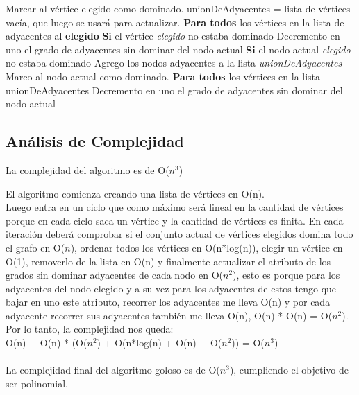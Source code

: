 \begin{codebox}
\li 	Marcar al vértice elegido como dominado.
\li 	unionDeAdyacentes = lista de vértices vacía, que luego se usará para actualizar.
\li 	\textbf{Para todos} los vértices en la lista de adyacentes al \textbf{elegido} \Do
\li 		\textbf{Si} el vértice \textit{elegido} no estaba dominado \Do
\li 			Decremento en uno el grado de adyacentes sin dominar del nodo actual \End
\li 		\textbf{Si} el nodo actual \textit{elegido} no estaba dominado \Do
\li 			Agrego los nodos adyacentes a la lista \textit{unionDeAdyacentes} \End
\li 		Marco al nodo actual como dominado. \End
\li 	\textbf{Para todos} los vértices en la lista unionDeAdyacentes \Do 
\li 			Decremento en uno el grado de adyacentes sin dominar del nodo actual \End %
\end{codebox}

\subsection{Análisis de Complejidad}

La complejidad del algoritmo es de O($n^3$)

El algoritmo comienza creando una lista de vértices en O(n).\\
Luego entra en un ciclo que como máximo será lineal en la cantidad de vértices porque en cada ciclo saca un vértice y la cantidad de vértices es finita. En cada iteración deberá comprobar si el conjunto actual de vértices elegidos domina todo el grafo en O($n$), ordenar todos los vértices en O(n*log(n)), elegir un vértice en O(1), removerlo de la lista en O(n) y finalmente actualizar el atributo de los grados sin dominar adyacentes de cada nodo en O($n^2$), esto es porque para los adyacentes del nodo elegido y a su vez para los adyacentes de estos tengo que bajar en uno este atributo, recorrer los adyacentes me lleva O(n) y por cada adyacente recorrer sus adyacentes también me lleva O(n), O(n) * O(n) = O($n^2$).\\

Por lo tanto, la complejidad nos queda:\\
O(n) + O(n) * (O($n^2$) + O(n*log(n) + O(n) + O($n^2$)) = O($n^3$)\\\\

La complejidad final del algoritmo goloso es de O($n^3$), cumpliendo el objetivo de ser polinomial.

